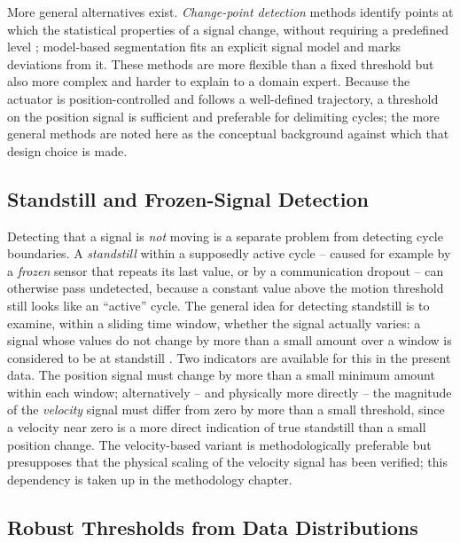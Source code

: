 More general alternatives exist. \emph{Change-point detection} methods identify points at
which the statistical properties of a signal change, without requiring a predefined
level \parencite{TODO-changepoint-detection}; model-based segmentation fits an explicit
signal model and marks deviations from it. These methods are more flexible than a fixed
threshold but also more complex and harder to explain to a domain expert. Because the
actuator is position-controlled and follows a well-defined trajectory, a threshold on the
position signal is sufficient and preferable for delimiting cycles; the more general
methods are noted here as the conceptual background against which that design choice is
made.

\subsection{Standstill and Frozen-Signal Detection}
\label{subsec:Grundlagen_TS_Stillstand}

Detecting that a signal is \emph{not} moving is a separate problem from detecting cycle
boundaries. A \emph{standstill} within a supposedly active cycle -- caused for example by a
\emph{frozen} sensor that repeats its last value, or by a communication dropout -- can
otherwise pass undetected, because a constant value above the motion threshold still looks
like an ``active'' cycle. The general idea for detecting standstill is to examine, within a
sliding time window, whether the signal actually varies: a signal whose values do not
change by more than a small amount over a window is considered to be at
standstill \parencite{TODO-steady-state-detection}. Two indicators are available for this
in the present data. The position signal must change by more than a small minimum amount
within each window; alternatively -- and physically more directly -- the magnitude of the
\emph{velocity} signal must differ from zero by more than a small threshold, since a
velocity near zero is a more direct indication of true standstill than a small position
change. The velocity-based variant is methodologically preferable but presupposes that the
physical scaling of the velocity signal has been verified; this dependency is taken up in
the methodology chapter.

\subsection{Robust Thresholds from Data Distributions}
\label{subsec:Grundlagen_TS_Schwellwerte}

